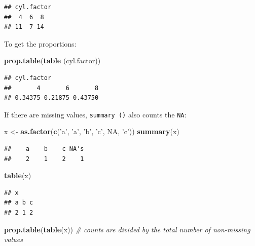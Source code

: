 \documentclass[]{book}
\newenvironment{Shaded}{\begin{snugshade}}{\end{snugshade}}
\newcommand{\CommentTok}[1]{\textcolor[rgb]{0.56,0.35,0.01}{\textit{#1}}}
\newcommand{\KeywordTok}[1]{\textcolor[rgb]{0.13,0.29,0.53}{\textbf{#1}}}
\newcommand{\NormalTok}[1]{#1}
\newcommand{\OtherTok}[1]{\textcolor[rgb]{0.56,0.35,0.01}{#1}}
\newcommand{\StringTok}[1]{\textcolor[rgb]{0.31,0.60,0.02}{#1}}
\begin{document}
\begin{verbatim}
## cyl.factor
##  4  6  8 
## 11  7 14
\end{verbatim}

To get the proportions:

\begin{Shaded}
\begin{Highlighting}[]
\KeywordTok{prop.table}\NormalTok{(}\KeywordTok{table}\NormalTok{ (cyl.factor))}
\end{Highlighting}
\end{Shaded}

\begin{verbatim}
## cyl.factor
##       4       6       8 
## 0.34375 0.21875 0.43750
\end{verbatim}

If there are missing values, \texttt{summary\ ()} also counts the \texttt{NA}:

\begin{Shaded}
\begin{Highlighting}[]
\NormalTok{x <-}\StringTok{ }\KeywordTok{as.factor}\NormalTok{(}\KeywordTok{c}\NormalTok{(}\StringTok{'a'}\NormalTok{, }\StringTok{'a'}\NormalTok{, }\StringTok{'b'}\NormalTok{, }\StringTok{'c'}\NormalTok{, }\OtherTok{NA}\NormalTok{, }\StringTok{'c'}\NormalTok{))}
\KeywordTok{summary}\NormalTok{(x)}
\end{Highlighting}
\end{Shaded}

\begin{verbatim}
##    a    b    c NA's 
##    2    1    2    1
\end{verbatim}

\begin{Shaded}
\begin{Highlighting}[]
\KeywordTok{table}\NormalTok{(x)}
\end{Highlighting}
\end{Shaded}

\begin{verbatim}
## x
## a b c 
## 2 1 2
\end{verbatim}

\begin{Shaded}
\begin{Highlighting}[]
\KeywordTok{prop.table}\NormalTok{(}\KeywordTok{table}\NormalTok{(x)) }\CommentTok{# counts are divided by the total number of non-missing values}
\end{Highlighting}
\end{Shaded}
\end{document}
